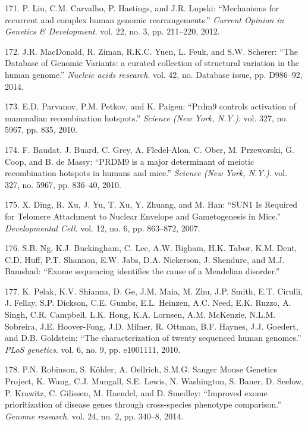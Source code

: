 \documentclass[12pt,twoside]{reedthesis}
\theoremstyle{definition}
\theoremstyle{definition}
\theoremstyle{remark}
\begin{document}
  \hypertarget{ref-Liu2012}{}
  171. P. Liu, C.M. Carvalho, P. Hastings, and J.R. Lupski: ``Mechanisms
  for recurrent and complex human genomic rearrangements.'' \emph{Current
  Opinion in Genetics \& Development}. vol. 22, no. 3, pp. 211--220, 2012.
  
  \hypertarget{ref-MacDonald2014}{}
  172. J.R. MacDonald, R. Ziman, R.K.C. Yuen, L. Feuk, and S.W. Scherer:
  ``The Database of Genomic Variants: a curated collection of structural
  variation in the human genome.'' \emph{Nucleic acids research}. vol. 42,
  no. Database issue, pp. D986--92, 2014.
  
  \hypertarget{ref-Parvanov2010}{}
  173. E.D. Parvanov, P.M. Petkov, and K. Paigen: ``Prdm9 controls
  activation of mammalian recombination hotspots.'' \emph{Science (New
  York, N.Y.)}. vol. 327, no. 5967, pp. 835, 2010.
  
  \hypertarget{ref-Baudat2010}{}
  174. F. Baudat, J. Buard, C. Grey, A. Fledel-Alon, C. Ober, M.
  Przeworski, G. Coop, and B. de Massy: ``PRDM9 is a major determinant of
  meiotic recombination hotspots in humans and mice.'' \emph{Science (New
  York, N.Y.)}. vol. 327, no. 5967, pp. 836--40, 2010.
  
  \hypertarget{ref-Ding2007}{}
  175. X. Ding, R. Xu, J. Yu, T. Xu, Y. Zhuang, and M. Han: ``SUN1 Is
  Required for Telomere Attachment to Nuclear Envelope and Gametogenesis
  in Mice.'' \emph{Developmental Cell}. vol. 12, no. 6, pp. 863--872,
  2007.
  
  \hypertarget{ref-Ng}{}
  176. S.B. Ng, K.J. Buckingham, C. Lee, A.W. Bigham, H.K. Tabor, K.M.
  Dent, C.D. Huff, P.T. Shannon, E.W. Jabs, D.A. Nickerson, J. Shendure,
  and M.J. Bamshad: ``Exome sequencing identifies the cause of a Mendelian
  disorder.''
  
  \hypertarget{ref-Pelak2010}{}
  177. K. Pelak, K.V. Shianna, D. Ge, J.M. Maia, M. Zhu, J.P. Smith, E.T.
  Cirulli, J. Fellay, S.P. Dickson, C.E. Gumbs, E.L. Heinzen, A.C. Need,
  E.K. Ruzzo, A. Singh, C.R. Campbell, L.K. Hong, K.A. Lornsen, A.M.
  McKenzie, N.L.M. Sobreira, J.E. Hoover-Fong, J.D. Milner, R. Ottman,
  B.F. Haynes, J.J. Goedert, and D.B. Goldstein: ``The characterization of
  twenty sequenced human genomes.'' \emph{PLoS genetics}. vol. 6, no. 9,
  pp. e1001111, 2010.
  
  \hypertarget{ref-Robinson2014}{}
  178. P.N. Robinson, S. Köhler, A. Oellrich, S.M.G. Sanger Mouse Genetics
  Project, K. Wang, C.J. Mungall, S.E. Lewis, N. Washington, S. Bauer, D.
  Seelow, P. Krawitz, C. Gilissen, M. Haendel, and D. Smedley: ``Improved
  exome prioritization of disease genes through cross-species phenotype
  comparison.'' \emph{Genome research}. vol. 24, no. 2, pp. 340--8, 2014.
  
\end{document}
